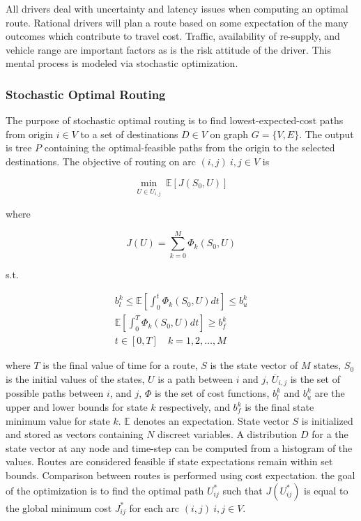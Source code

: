 All drivers deal with uncertainty and latency issues when computing an optimal route. Rational drivers will plan a route based on some expectation of the many outcomes which contribute to travel cost. Traffic, availability of re-supply, and vehicle range are important factors as is the risk attitude of the driver. This mental process is modeled via stochastic optimization.

\subsubsection*{Stochastic Optimal Routing}

The purpose of stochastic optimal routing is to find lowest-expected-cost paths from origin $i \in V$ to a set of destinations $D \in V$ on graph $G = \{V, E\}$. The output is tree $P$ containing the optimal-feasible paths from the origin to the selected destinations. The objective of routing on arc $(i,j)\ i, j \in V$ is

\begin{equation}
	\min_{U \in \overline{U}_{i,j}}\ \mathbb{E}[J(S_0, U)]
\end{equation}

where

\begin{equation}
	J(U) = \sum_{k = 0}^M \Phi_k(S_0, U)
\end{equation}

s.t.

\begin{gather}	
	b^k_l \leq \mathbb{E}\left[\int_0^t \Phi_k(S_0, U)dt\right] \leq b^k_u\\
	\mathbb{E}\left[\int_0^T \Phi_k(S_0, U)dt\right] \geq b^k_f\\
	t \in [0, T]\quad k = 1, 2, \dots, M
\end{gather}

\noindent where $T$ is the final value of time for a route, $S$ is the state vector of $M$ states, $S_0$ is the initial values of the states, $U$ is a path between $i$ and $j$, $\overline{U}_{i,j}$ is the set of possible paths between $i$, and $j$, $\Phi$ is the set of cost functions, $b^k_l$ and $b^k_u$ are the upper and lower bounds for state $k$ respectively, and $b^k_f$ is the final state minimum value for state $k$. $\mathbb{E}$ denotes an expectation. State vector $S$ is initialized and stored as vectors containing $N$ discreet variables. A distribution $D$ for a the state vector at any node and time-step can be computed from a histogram of the values. Routes are considered feasible if state expectations remain within set bounds. Comparison between routes is performed using cost expectation. the goal of the optimization is to find the optimal path $U_{ij}^*$ such that $J(U_{ij}^*)$ is equal to the global minimum cost $J_{ij}^*$ for each arc $(i,j)\ i,j\in V$.

